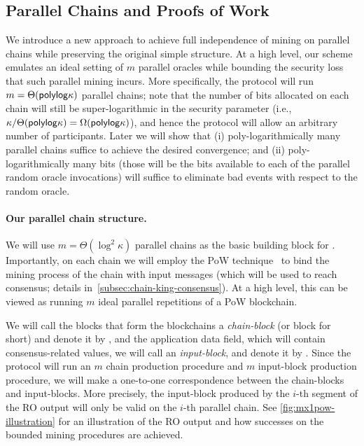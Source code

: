 \subsection{Parallel Chains and \mforone Proofs of Work}
\label{subsec:parallel-chains}

We introduce a new approach to achieve full independence of mining on parallel chains while preserving the original simple structure.
%
At a high level, our scheme emulates an ideal setting of $m$ parallel oracles while bounding the security loss that such parallel mining incurs.
%
More specifically, the protocol will run $m = \Theta(\mathsf{polylog} \kappa)$ parallel chains; note that the number of bits allocated on each chain will still be super-logarithmic in the security parameter (i.e., $\kappa / \Theta(\mathsf{polylog} \kappa)  = \Omega(\mathsf{polylog} \kappa)$), and hence the protocol will allow an arbitrary number of participants.
%
Later we will show that (i) poly-logarithmically many parallel chains suffice to achieve the desired convergence; and (ii) poly-logarithmically many bits (those will be the bits available to each of the parallel random oracle invocations) will suffice to eliminate bad events with respect to the random oracle.

\paragraph{Our parallel chain structure.}
%
We will use $m = \Theta(\log^2 \kappa)$ parallel chains as the basic building block for \chainKingConsensus.
%
Importantly, on each chain we will employ the \twoforone PoW technique~\cite{EC:GarKiaLeo15} to bind the mining process of the chain with input messages (which will be used to reach consensus; details in~\cref{subsec:chain-king-consensus}).
%
At a high level, this can be viewed as running $m$ ideal parallel repetitions of a \twoforone PoW blockchain.

We will call the blocks that form the blockchains a \emph{chain-block} (or block for short) and denote it by \block, and the application data field, which will contain consensus-related values, we will call an \emph{input-block}, and denote it by \IB.
%
Since the protocol will run an $m$ chain production procedure and $m$ input-block production procedure, we will make a one-to-one correspondence between the chain-blocks and input-blocks.
%
More precisely, the input-block produced by the $i$-th segment of the RO output will only be valid on the $i$-th parallel chain.
%
See \cref{fig:mx1pow-illustration} for an illustration of the RO output and how successes on the bounded mining procedures are achieved.

